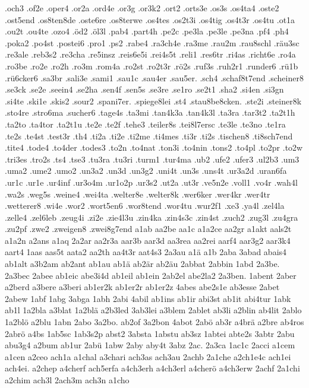 {.och3
.of2e
.oper4
.or2a
.ord4e
.or3g
.or3k2
.ort2
.orts3e
.os3s
.os4ta4
.oste2
.ost5end
.os8ten8de
.oste6re
.os8terwe
.os4tes
.os2t3i
.os4tig
.os4t3r
.os4tu
.ot1a
.ou2t
.ou4te
.ozo4
.öd2
.öl3l
.pab4
.part4h
.pe2c
.pe3la
.pe3le
.pe3na
.pf4
.ph4
.poka2
.po4st
.postei6
.pro1
.ps2
.rabe4
.ra3ch4e
.ra3me
.rau2m
.rau8schl
.räu3sc
.re3ale
.reb3s2
.re3cha
.re5insz
.reis6e5i
.rei4s5t
.reli1
.res6tr
.ri4as
.richt6e
.ro4a
.ro3be
.ro2e
.ro2h
.ro3m
.rom4a
.ro2st
.ro2t3r
.rö2s
.ruf3s
.ruh2r1
.runder6
.rü1b
.rü6cker6
.sa3br
.sali3e
.sami1
.sau1c
.sau4er
.sau5er.
.sch4
.schaf8t7end
.scheiner8
.se3ck
.se2e
.seein4
.se2ha
.sen4f
.sen5s
.se3re
.se1ro
.se2t1
.sha2
.si4en
.si3gn
.si4te
.ski1e
.skis2
.sour2
.spani7er.
.spiege8lei
.st4
.stau8be8cken.
.ste2i
.steiner8k
.sto4re
.stro6ma
.sucher6
.tage4s
.ta3mi
.tan4k3a
.tan4k3l
.ta3ra
.tar3t2
.ta2t1h
.ta2to
.ta4tor
.ta2t1u
.te2e
.te2f
.tehe3
.teiler8s
.tei8l7ersc
.te3le
.te3no
.te1ra
.te2s
.te4st
.test3r
.th4
.ti2a
.ti2e
.ti2me
.ti4mes
.ti3r
.ti2s
.tischen8
.ti8sch7end
.tite4
.tode4
.to4der
.todes3
.to2n
.to4nat
.ton3i
.to4nin
.tons2
.to4pl
.to2pr
.to2w
.tri3es
.tro2s
.ts4
.tse3
.tu3ra
.tu3ri
.turm1
.tur4ma
.ub2
.ufe2
.ufer3
.ul2b3
.um3
.uma2
.ume2
.umo2
.un3a2
.un3d
.un3g2
.uni4t
.un3s
.uns4t
.ur3a2d
.uran6fa
.ur1c
.ur1e
.ur4inf
.ur3o4m
.ur1o2p
.ur3s2
.ut2a
.ut3r
.ve5n2e
.voll1
.vo4r
.wah4l
.wa2s
.weg5s
.weine4
.wei4ta
.welter8e
.welter8k
.wer6ker
.wer4kr
.wer4tr
.wetterer8
.wi4e
.wor2
.wort5en6
.wor8tend
.wor4tu
.wur2f1
.xe3
.ya4l
.zel4la
.zelle4
.zel6leb
.zeug4i
.zi2e
.zie4l3u
.zin4ka
.zin4s3c
.zin4st
.zuch2
.zug3l
.zu4gra
.zu2pf
.zwe2
.zweigen8
.zwei8g7end
a1ab
aa2be
aa1c
a1a2ce
aa2gr
a1akt
aals2t
a1a2n
a2ans
a1aq
2a2ar
aa2r3a
aar3b
aar3d
aa3rea
aa2rei
aarf4
aar3g2
aar3k4
aart4
1aas
aas5t
aata2
aa2th
aa4t3r
aat4s3
2a3au
a1ä
a1b
2aba
3abad
abais4
ab1alt
a3b2am
ab2ant
ab1au
ab1ä
ab2är
ab2äu
2abbat
2abbin
1abd
2a3be.
2a3bec
2abee
ab1eic
abe3i4d
ab1eil
ab1ein
2ab2el
abe2la2
2a3ben.
1abent
2aber
a2berd
a3bere
a3beri
ab1er2k
ab1er2r
ab1er2z
4abes
abe2s1e
ab3esse
2abet
2abew
1abf
1abg
3abga
1abh
2abi
4abil
ab1ins
ab1ir
abi3st
ab1it
abi4tur
1abk
ab1l
1a2bla
a3blat
1a2blä
a2b3led
3ab3lei
a3blem
2ablet
ab3li
a2blin
ab4lit
2ablo
1a2blö
a2blu
1abn
2abo
3a2bo.
ab2of
3a2bon
4abot
2abö
ab3r
a4brä
a2bre
ab4ros
2abrö
a4bs
1ab5sc
1ab3s2p
abst2
3absta
1abstu
ab3sz
1abtei
abte2s
3abtr
2abu
abu3g4
a2bum
ab1ur
2abü
1abw
2aby
aby4t
3abz
2ac.
2a3ca
1ac1c
2acci
a1cem
a1cen
a2ceo
ach1a
a1chal
a3chari
ach3as
ach3au
2achb
2a1che
a2ch1e4c
ach1ei
ach4ei.
a2chep
a4cherf
ach5erfa
a4ch3erh
a4ch3erl
a4cherö
a4ch3erw
2achf
2a1chi
a2chim
ach3l
2ach3m
ach3n
a1cho
}
